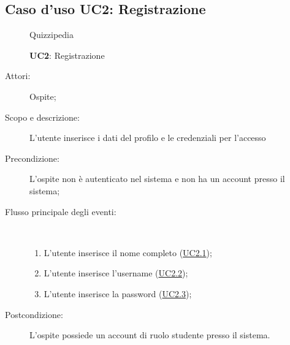 \subsection{Caso d'uso UC2: Registrazione}
	\begin{figure}[H]
		\centering
		\begin{resizedtikzpicture}{\textwidth}
		\begin{umlsystem}[x=0, fill=lightgray!20]{Quizzipedia}
		\end{umlsystem}
		\end{resizedtikzpicture}
		\caption{\textbf{UC2}: Registrazione}
		\label{UC2}
	\end{figure}
\begin{description}
\item[Attori:] Ospite;
\item[Scopo e descrizione:] L'utente inserisce i dati del profilo e le credenziali per l'accesso
      \item[Precondizione:] L'ospite non è autenticato nel sistema e non ha un account presso il sistema;

        \item[Flusso principale degli eventi:] \ 
 \begin{enumerate}
          \item L'utente inserisce il nome completo (\hyperlink{UC2.1}{UC2.1});
          \item L'utente inserisce l'username (\hyperlink{UC2.2}{UC2.2});
          \item L'utente inserisce la password (\hyperlink{UC2.3}{UC2.3});

      \end{enumerate}
    \item[Postcondizione:] L’ospite possiede un account di ruolo studente presso il sistema.
  \end{description}
\hypertarget{UC2.1}{}
